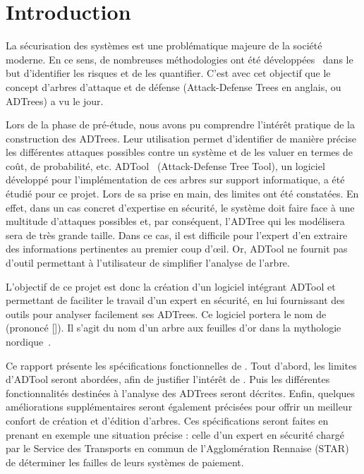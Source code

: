 \section{Introduction}
    La sécurisation des systèmes est une problématique majeure de la société moderne. En ce sens, de nombreuses méthodologies ont été développées~\cite{introSecurite,ADTreeKordy} dans le but d'identifier les risques et de les quantifier. C'est avec cet objectif que le concept d'arbres d'attaque et de défense (\og Attack-Defense Trees \fg{} en anglais, ou ADTrees) a vu le jour.

    Lors de la phase de pré-étude, nous avons pu comprendre l’intérêt pratique de la construction des ADTrees. Leur utilisation permet d'identifier de manière précise les différentes attaques possibles contre un système et de les valuer en termes de coût, de probabilité, etc. ADTool~\cite{adtool_paper} (Attack-Defense Tree Tool), un logiciel développé pour l'implémentation de ces arbres sur support informatique, a été étudié pour ce projet. Lors de sa prise en main, des limites ont été constatées. En effet, dans un cas concret d'expertise en sécurité, le système doit faire face à une multitude d'attaques possibles et, par conséquent, l'ADTree qui les modélisera sera de très grande taille. Dans ce cas, il est difficile pour l'expert d'en extraire des informations pertinentes au premier coup d’œil. Or, ADTool ne fournit pas d'outil permettant à l'utilisateur de simplifier l'analyse de l'arbre. 

    L'objectif de ce projet est donc la création d'un logiciel intégrant ADTool et permettant de faciliter le travail d'un expert en sécurité, en lui fournissant des outils pour analyser facilement ses ADTrees. Ce logiciel portera le nom de \glasir{} (prononcé []). Il s'agit du nom d'un arbre aux feuilles d'or dans la mythologie nordique~\cite{vikingCulture}.

    Ce rapport présente les spécifications fonctionnelles de \glasir{}. Tout d'abord, les limites d'ADTool seront abordées, afin de justifier l'intérêt de \glasir{}. Puis les différentes fonctionnalités destinées à l'analyse des ADTrees seront décrites. Enfin, quelques améliorations supplémentaires seront également précisées pour offrir un meilleur confort de création et d'édition d'arbres. Ces spécifications seront faites en prenant en exemple une situation précise : celle d'un expert en sécurité chargé par le Service des Transports en commun de l'Agglomération Rennaise (STAR) de déterminer les failles de leurs systèmes de paiement.